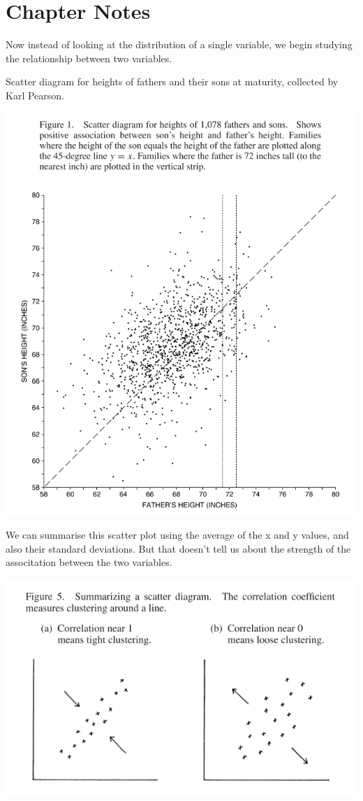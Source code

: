 \documentclass[
]{book}
\begin{document}
\hypertarget{chapter-notes-7}{%
\section{Chapter Notes}\label{chapter-notes-7}}

Now instead of looking at the distribution of a single variable, we begin studying the relationship between two variables.

Scatter diagram for heights of fathers and their sons at maturity, collected by Karl Pearson.

\includegraphics{images/Ch08Img01.png}

We can summarise this scatter plot using the average of the x and y values, and also their standard deviations. But that doesn't tell us about the strength of the associtation between the two variables.

\includegraphics{images/Ch08Img02.png}
\end{document}
